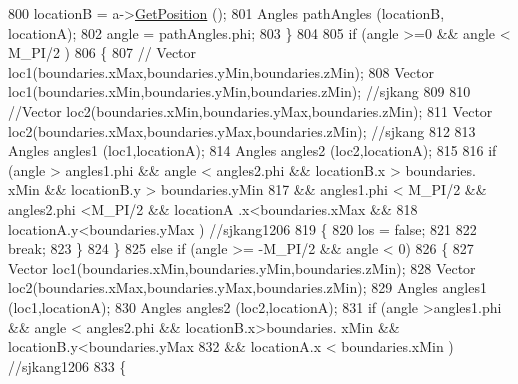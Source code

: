 \begin{DoxyCode}
800                                 locationB = a->\hyperlink{classns3_1_1MobilityModel_aba838f06ec5bbb2d193d94b8c0e4abb4}{GetPosition} ();
801                                 Angles pathAngles (locationB, locationA);
802                                 angle = pathAngles.phi;
803                         \}
804 
805                         \textcolor{keywordflow}{if} (angle >=0 && angle < M\_PI/2 )
806                         \{
807                         \textcolor{comment}{//      Vector loc1(boundaries.xMax,boundaries.yMin,boundaries.zMin);}
808                                 Vector loc1(boundaries.xMin,boundaries.yMin,boundaries.zMin); \textcolor{comment}{//sjkang}
809 
810                                 \textcolor{comment}{//Vector loc2(boundaries.xMin,boundaries.yMax,boundaries.zMin);}
811                                 Vector loc2(boundaries.xMax,boundaries.yMax,boundaries.zMin); \textcolor{comment}{//sjkang}
812 
813                                 Angles angles1 (loc1,locationA);
814                                 Angles angles2 (loc2,locationA);
815 
816                                 \textcolor{keywordflow}{if} (angle > angles1.phi && angle < angles2.phi && locationB.x > boundaries.
      xMin && locationB.y > boundaries.yMin
817                                                 && angles1.phi < M\_PI/2 && angles2.phi <M\_PI/2 && locationA
      .x<boundaries.xMax &&
818                                                 locationA.y<boundaries.yMax ) \textcolor{comment}{//sjkang1206}
819                                 \{
820                                         los = \textcolor{keyword}{false};
821 
822                                         \textcolor{keywordflow}{break};
823                                 \}
824                         \}
825                         \textcolor{keywordflow}{else} \textcolor{keywordflow}{if} (angle >= -M\_PI/2 && angle < 0)
826                         \{
827                                 Vector loc1(boundaries.xMin,boundaries.yMin,boundaries.zMin);
828                                 Vector loc2(boundaries.xMax,boundaries.yMax,boundaries.zMin);
829                                 Angles angles1 (loc1,locationA);
830                                 Angles angles2 (loc2,locationA);
831                                 \textcolor{keywordflow}{if} (angle >angles1.phi && angle < angles2.phi && locationB.x>boundaries.
      xMin && locationB.y<boundaries.yMax
832                                                 && locationA.x < boundaries.xMin  ) \textcolor{comment}{//sjkang1206}
833                                 \{

\end{DoxyCode}
